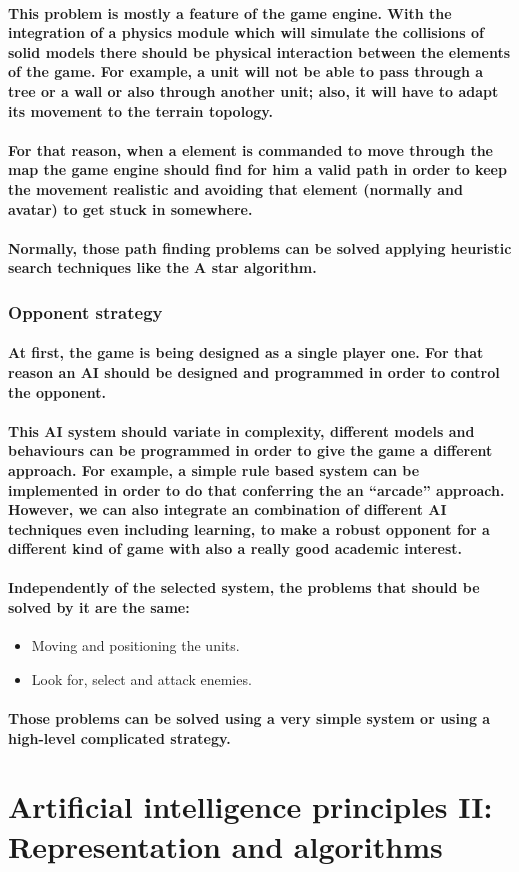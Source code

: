 \documentclass[a4paper,10pt]{article}
\newcommand{\p}[1]{\paragraph{\indent\textnormal{#1}}}
\begin{document}
    \p{This problem is mostly a feature of the game engine. With the integration of a physics module which will simulate the collisions of solid models there should be physical interaction between the elements of the game. For example, a unit will not be able to pass through a tree or a wall or also through another unit; also, it will have to adapt its movement to the terrain topology.}

    \p{For that reason, when a element is commanded to move through the map the game engine should find for him a valid path in order to keep the movement realistic and avoiding that element (normally and avatar) to get stuck in somewhere.}

    \p{Normally, those path finding problems can be solved applying heuristic search techniques like the A star algorithm.}

   \subsubsection{Opponent strategy}

    \p{At first, the game is being designed as a single player one. For that reason an AI should be designed and programmed in order to control the opponent.}

    \p{This AI system should variate in complexity, different models and behaviours can be programmed in order to give the game a different approach. For example, a simple rule based system can be implemented in order to do that conferring the an ``arcade'' approach. However, we can also integrate an combination of different AI techniques even including learning, to make a robust opponent for a different kind of game with also a really good academic interest.}

    \p{Independently of the selected system, the problems that should be solved by it are the same:}

    \begin{itemize}
     \item Moving and positioning the units.
     \item Look for, select and attack enemies.
    \end{itemize}
  
    \p{Those problems can be solved using a very simple system or using a high-level complicated strategy.}


  \newpage
\section{Artificial intelligence principles II: Representation and algorithms}
\end{document}
